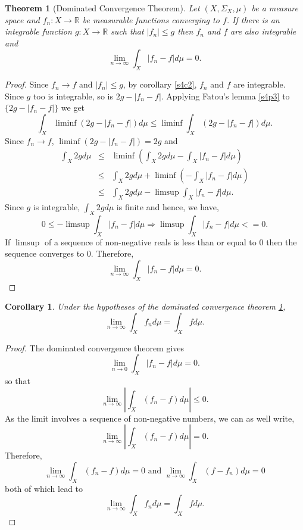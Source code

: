 \documentclass{article}
\newcommand{\sor}{\mathbb{R}}
\theoremstyle{plain}
\newtheorem{thm}{Theorem}
\numberwithin{thm}{section}
\theoremstyle{plain}
\numberwithin{prop}{section}
\theoremstyle{definition}
\numberwithin{defn}{section}
\theoremstyle{remark}
\theoremstyle{plain}
\newtheorem{cor}{Corollary}
\numberwithin{cor}{section}
\numberwithin{equation}{section}
\begin{document}
\begin{thm}[Dominated Convergence Theorem]\label{s4t4} Let $(X, \Sigma_X, \mu)$
be a measure space and $f_n:X \rightarrow \sor$ be measurable functions converging
to $f$. If there is an integrable function $g: X \rightarrow \sor$ such that $|f_n|
\le g$ then $f_n$ and $f$ are also integrable and 
\[
\lim_{n \rightarrow \infty}\int_X |f_n - f|d\mu = 0.
\]
\end{thm}
\begin{proof}
Since $f_n \rightarrow f$ and $|f_n| \le g$, by corollary \ref{s4c2}, $f_n$ and
$f$ are integrable. Since $g$ too is integrable, so is $2g - |f_n - f|$. 
Applying Fatou's lemma \ref{s4p3} to $\{2g - |f_n - f|\}$ we get
\[
\int_X\liminf (2g - |f_n - f|) d\mu \le \liminf\int_X (2g - |f_n - f|)d\mu.
\]
Since $f_n \rightarrow f$, $\liminf(2g - |f_n - f|) = 2g$ and
\begin{eqnarray*}
\int_X 2g d\mu &\le& \liminf\left(\int_X 2g d\mu - \int_X |f_n - f|d\mu\right) \\
 &\le& \int_X 2g d\mu + \liminf\left(-\int_X|f_n - f|d\mu\right) \\
 &\le& \int_X 2g d\mu - \limsup\int_X|f_n - f|d\mu.
\end{eqnarray*}
Since $g$ is integrable, $\int_X 2g d\mu$ is finite and hence, we have,
\[
0 \le -\limsup\int_X|f_n - f|d\mu \Rightarrow \limsup\int_X|f_n - f|d\mu <= 0.
\]
If $\limsup$ of a sequence of non-negative reals is less than or equal to $0$
then the sequence converges to $0$. Therefore,
\[
\lim_{n \rightarrow \infty}\int_X |f_n - f|d\mu = 0.
\]
\end{proof}

\begin{cor}\label{s4c3}
Under the hypotheses of the dominated convergence theorem \ref{s4t4},
\[
\lim_{n \rightarrow \infty}\int_X f_n d\mu = \int_X fd\mu.
\]
\end{cor}
\begin{proof}
The dominated convergence theorem gives
\[
\lim_{n \rightarrow 0}\int_X |f_n - f|d\mu = 0.
\]
so that
\[
\lim_{n \rightarrow \infty}\left|\int_X (f_n - f)d\mu\right| \le 0.
\]
As the limit involves a sequence of non-negative numbers, we can as well write,
\[
\lim_{n \rightarrow \infty}\left|\int_X (f_n - f)d\mu\right| = 0.
\]
Therefore,
\[
\lim_{n \rightarrow \infty}\int_X (f_n - f)d\mu = 0 \text{ and }
\lim_{n \rightarrow \infty}\int_X (f - f_n)d\mu = 0 
\]
both of which lead to
\[
\lim_{n \rightarrow \infty}\int_X f_n d\mu = \int_X fd\mu.
\]
\end{proof}
\end{document}
